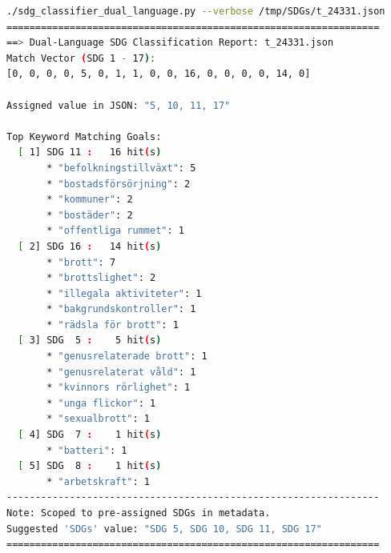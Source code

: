 \begin{casestudySection}
\begin{lstlisting}[language={bash}, basicstyle=\footnotesize, escapechar=|, breaklines=true,
    postbreak=\usebox{\lstbreakbox}, caption={Program's output (after adding Swedish Social-Policy Vocabulary)}, label=lst:t_24331Output]
./sdg_classifier_dual_language.py --verbose /tmp/SDGs/t_24331.json
=================================================================
==> Dual-Language SDG Classification Report: t_24331.json
Match Vector (SDG 1 - 17):
[0, 0, 0, 0, 5, 0, 1, 1, 0, 0, 16, 0, 0, 0, 0, 14, 0]

Assigned value in JSON: "5, 10, 11, 17"

Top Keyword Matching Goals:
  [ 1] SDG 11 :   16 hit(s)
       * "befolkningstillväxt": 5
       * "bostadsförsörjning": 2
       * "kommuner": 2
       * "bostäder": 2
       * "offentliga rummet": 1
  [ 2] SDG 16 :   14 hit(s)
       * "brott": 7
       * "brottslighet": 2
       * "illegala aktiviteter": 1
       * "bakgrundskontroller": 1
       * "rädsla för brott": 1
  [ 3] SDG  5 :    5 hit(s)
       * "genusrelaterade brott": 1
       * "genusrelaterat våld": 1
       * "kvinnors rörlighet": 1
       * "unga flickor": 1
       * "sexualbrott": 1
  [ 4] SDG  7 :    1 hit(s)
       * "batteri": 1
  [ 5] SDG  8 :    1 hit(s)
       * "arbetskraft": 1
-----------------------------------------------------------------
Note: Scoped to pre-assigned SDGs in metadata.
Suggested 'SDGs' value: "SDG 5, SDG 10, SDG 11, SDG 17"
=================================================================
\end{lstlisting}


\end{casestudySection}
